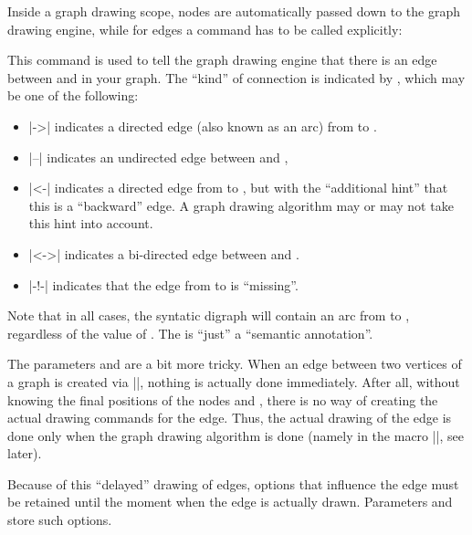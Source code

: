 Inside a graph drawing scope, nodes are
automatically passed down to the graph drawing engine, while for edges
a command has to be called explicitly:

\begin{command}{\pgfgdedge{}}
  This command is used to tell the graph drawing engine that there is
  an edge between  and  in your
  graph. The ``kind'' of connection is indicated by ,
  which may be one of the following:
  \begin{itemize}
  \item 
    |->| indicates a directed edge (also known as an arc) from
     to .
  \item |--| indicates an undirected edge between 
    and ,
  \item |<-| indicates a directed edge from  to
    , but with the ``additional hint'' that this is a
    ``backward'' edge. A graph drawing algorithm may  or may not take
    this hint into account.
  \item |<->| indicates a bi-directed edge between 
    and . 
  \item |-!-| indicates that the edge from  to
     is ``missing''. 
  \end{itemize}
  Note that in all cases, the syntatic digraph will contain an arc
  from  to , regardless of the
  value of . The  is ``just'' a
  ``semantic annotation''.
  
  The parameters  and  are a bit
  more tricky. When an edge between two vertices of a graph is created
  via |\pgfgdedge|, nothing is actually done immediately. After all,
  without knowing the final positions of the nodes 
  and , there is no way of creating the actual
  drawing commands for the edge. Thus, the actual drawing of the edge
  is done only when the graph drawing algorithm is done (namely in the
  macro |\pgfgdedgecallback|, see later). 

  Because of this ``delayed'' drawing of edges, options that influence
  the edge must be retained until the moment when the edge is actually
  drawn. Parameters  and  store such
  options. 


\end{command}
